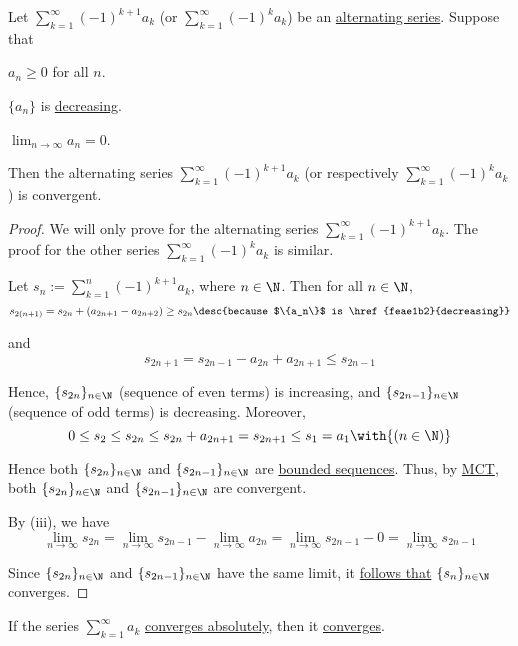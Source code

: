 \label{a0d7ad6}

Let $\sum_{k=1}^\infty(-1)^{k+1}a_k$ (or $\sum_{k=1}^\infty(-1)^{k}a_k$) be an
\href{b582bde}{alternating series}. Suppose that
\begin{enumerati}
  \item $a_n\geq0$ for all $n$.
  \item $\{a_n\}$ is \href{feae1b2}{decreasing}.
  \item $\lim_{n\to\infty}a_n=0$.
\end{enumerati}

Then the alternating series $\sum_{k=1}^\infty(-1)^{k+1}a_k$ (or respectively
$\sum_{k=1}^\infty(-1)^{k}a_k$) is convergent.

\begin{proof}
  We will only prove for the alternating series
  $\sum_{k=1}^\infty(-1)^{k+1}a_k$. The proof for the other series
  $\sum_{k=1}^\infty(-1)^{k}a_k$ is similar.

  Let $s_n:=\sum_{k=1}^n(-1)^{k+1}a_k$, where $n\in\N$. Then for all $n\in\N$,
  $$
    s_{2(n+1)}=s_{2n}+(a_{2n+1}-a_{2n+2})\geq s_{2n}\desc{because $\{a_n\}$ is \href{feae1b2}{decreasing}}
  $$

  and
  $$
    s_{2n+1}=s_{2n-1}-a_{2n}+a_{2n+1}\leq s_{2n-1}
  $$

  Hence, $\{s_{2n}\}_{n\in\N}$ (sequence of even terms) is increasing, and
  $\{s_{2n-1}\}_{n\in\N}$ (sequence of odd terms) is decreasing. Moreover,
  $$
    0\leq s_2\leq s_{2n}\leq s_{2n}+a_{2n+1}=s_{2n+1}\leq s_1=a_1\with{(n\in\N)}
  $$

  Hence both $\{s_{2n}\}_{n\in\N}$ and $\{s_{2n-1}\}_{n\in\N}$ are
  \href{d5ed299}{bounded sequences}. Thus, by \href{cc11aa4}{MCT}, both
  $\{s_{2n}\}_{n\in\N}$ and $\{s_{2n-1}\}_{n\in\N}$ are convergent.

  By (iii), we have
  $$
    \lim_{n\to\infty}s_{2n}=
    \lim_{n\to\infty}s_{2n-1}-\lim_{n\to\infty}a_{2n}=
    \lim_{n\to\infty}s_{2n-1}-0=
    \lim_{n\to\infty}s_{2n-1}
  $$

  Since $\{s_{2n}\}_{n\in\N}$ and $\{s_{2n-1}\}_{n\in\N}$ have the same limit,
  it \href{cca7bfc}{follows that} $\{s_{n}\}_{n\in\N}$ converges.
\end{proof}

\label{e8bb6e3}

If the series $\sum_{k=1}^\infty a_k$ \href{f823d65}{converges absolutely},
then it \href{f8901df}{converges}.

